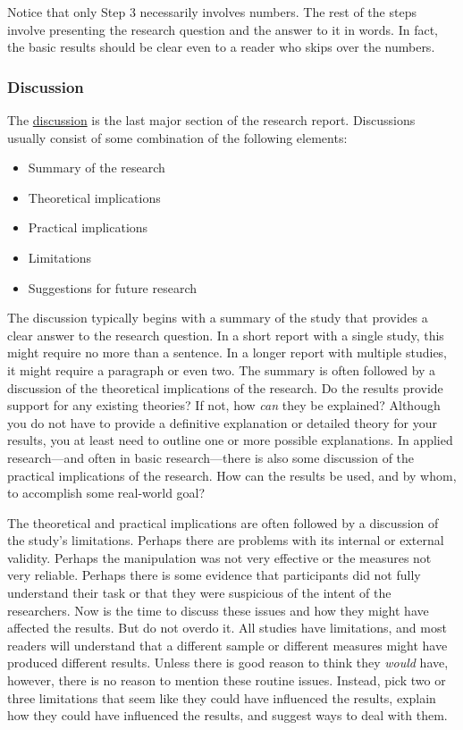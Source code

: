 \documentclass[
]{krantz}
\providecommand{\tightlist}{%
  \setlength{\itemsep}{0pt}\setlength{\parskip}{0pt}}
\begin{document}
Notice that only Step 3 necessarily involves numbers. The rest of the steps involve presenting the research question and the answer to it in words. In fact, the basic results should be clear even to a reader who skips over the numbers.

\hypertarget{discussion}{%
\subsubsection*{Discussion}\label{discussion}}


The \protect\hyperlink{discussion-1}{discussion} is the last major section of the research report. Discussions usually consist of some combination of the following elements:

\begin{itemize}
\tightlist
\item
  Summary of the research
\item
  Theoretical implications
\item
  Practical implications
\item
  Limitations
\item
  Suggestions for future research
\end{itemize}

The discussion typically begins with a summary of the study that provides a clear answer to the research question. In a short report with a single study, this might require no more than a sentence. In a longer report with multiple studies, it might require a paragraph or even two. The summary is often followed by a discussion of the theoretical implications of the research. Do the results provide support for any existing theories? If not, how \emph{can} they be explained? Although you do not have to provide a definitive explanation or detailed theory for your results, you at least need to outline one or more possible explanations. In applied research---and often in basic research---there is also some discussion of the practical implications of the research. How can the results be used, and by whom, to accomplish some real-world goal?

The theoretical and practical implications are often followed by a discussion of the study's limitations. Perhaps there are problems with its internal or external validity. Perhaps the manipulation was not very effective or the measures not very reliable. Perhaps there is some evidence that participants did not fully understand their task or that they were suspicious of the intent of the researchers. Now is the time to discuss these issues and how they might have affected the results. But do not overdo it. All studies have limitations, and most readers will understand that a different sample or different measures might have produced different results. Unless there is good reason to think they \emph{would} have, however, there is no reason to mention these routine issues. Instead, pick two or three limitations that seem like they could have influenced the results, explain how they could have influenced the results, and suggest ways to deal with them.
\end{document}
